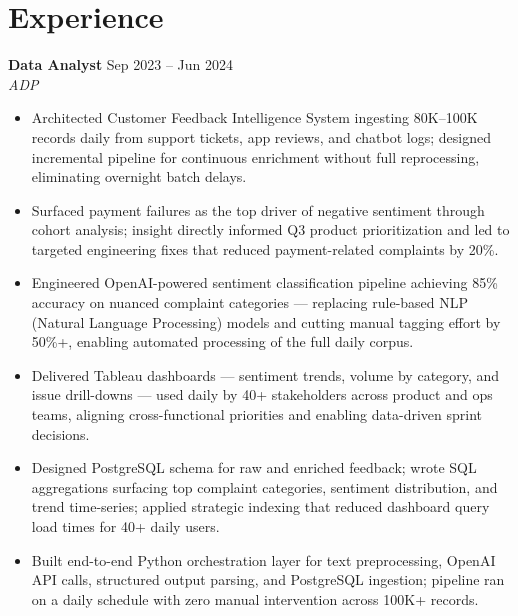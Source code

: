 \documentclass[10pt,letterpaper]{article}
\newcommand{\entry}[3]{%
  \vspace{3pt}\textbf{#1} \hfill #3 \\
  \textit{\small #2}\vspace{1pt}}
\begin{document}
\section{Experience}

\entry{Data Analyst}{ADP}{Sep 2023 -- Jun 2024}
\begin{itemize}
  \item Architected Customer Feedback Intelligence System ingesting 80K--100K records daily from support tickets, app reviews, and chatbot logs; designed incremental pipeline for continuous enrichment without full reprocessing, eliminating overnight batch delays.
  \item Surfaced payment failures as the top driver of negative sentiment through cohort analysis; insight directly informed Q3 product prioritization and led to targeted engineering fixes that reduced payment-related complaints by 20\%.
  \item Engineered OpenAI-powered sentiment classification pipeline achieving 85\% accuracy on nuanced complaint categories --- replacing rule-based NLP (Natural Language Processing) models and cutting manual tagging effort by 50\%+, enabling automated processing of the full daily corpus.
  \item Delivered Tableau dashboards --- sentiment trends, volume by category, and issue drill-downs --- used daily by 40+ stakeholders across product and ops teams, aligning cross-functional priorities and enabling data-driven sprint decisions.
  \item Designed PostgreSQL schema for raw and enriched feedback; wrote SQL aggregations surfacing top complaint categories, sentiment distribution, and trend time-series; applied strategic indexing that reduced dashboard query load times for 40+ daily users.
  \item Built end-to-end Python orchestration layer for text preprocessing, OpenAI API calls, structured output parsing, and PostgreSQL ingestion; pipeline ran on a daily schedule with zero manual intervention across 100K+ records.
\end{itemize}
\end{document}
